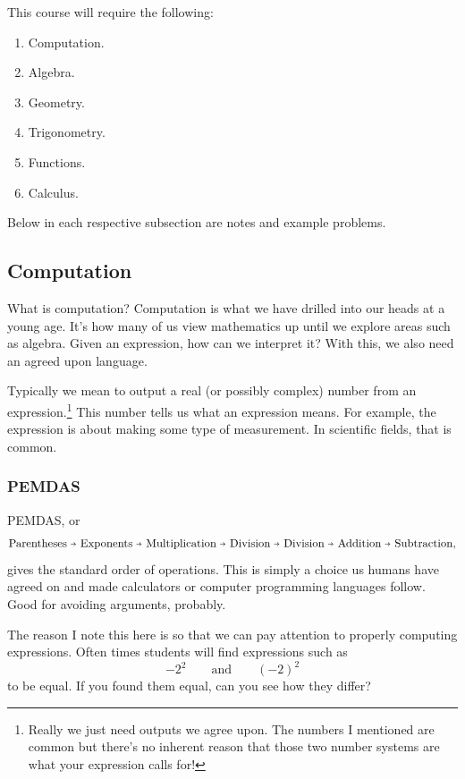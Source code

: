     This course will require the following:
    \begin{enumerate}[1.]
        \item Computation.
        \item Algebra.
        \item Geometry.
        \item Trigonometry.
        \item Functions.
        \item Calculus.
    \end{enumerate}

    \noindent Below in each respective subsection are notes and example problems.

    \subsection{Computation}

    What is computation? Computation is what we have drilled into our heads at a young age.  It's how many of us view mathematics up until we explore areas such as algebra.  Given an expression, how can we interpret it?  With this, we also need an agreed upon language.

    Typically we mean to output a real (or possibly complex) number from an expression.\footnote{Really we just need outputs we agree upon. The numbers I mentioned are common but there's no inherent reason that those two number systems are what your expression calls for!} This number tells us what an expression means. For example, the expression is about making some type of measurement. In scientific fields, that is common.

    \subsubsection{PEMDAS}

    PEMDAS, or
    \[
    \textrm{Parentheses $\veryshortarrow$ Exponents $\veryshortarrow$ Multiplication $\veryshortarrow$ Division $\veryshortarrow$ Division $\veryshortarrow$ Addition $\veryshortarrow$ Subtraction},
    \]
    gives the standard order of operations.  This is simply a choice us humans have agreed on and made calculators or computer programming languages follow.  Good for avoiding arguments, probably.

    The reason I note this here is so that we can pay attention to properly computing expressions.  Often times students will find expressions such as
    \[
    -2^2 \qquad \textrm{and} \qquad (-2)^2
    \]
    to be equal. If you found them equal, can you see how they differ?


